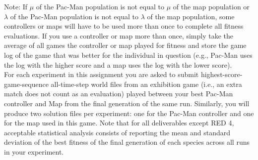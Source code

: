 \documentclass{article}
\begin{document}
Note: If $\mu$ of the Pac-Man population is not equal to $\mu$  of the map population or $\lambda$ of the Pac-Man population is not equal to $\lambda$ of the map population, some controllers or maps will have to be used more than once to complete all fitness evaluations. If you use a controller or map more than once, simply take the average of all games the controller or map played for fitness and store the game log of the game that was better for the individual in question (e.g., Pac-Man uses the log with the higher score and a map uses the log with the lower score).\\


For each experiment in this assignment you are asked to submit highest-score-game-sequence all-time-step world files from an exhibition game (i.e., an extra match does not count as an evaluation) played between your best Pac-Man controller and Map from the final generation of the same run. Similarly, you will produce two solution files per experiment: one for the Pac-Man controller and one for the map used in this game. Note that for all deliverables except RED 4, acceptable statistical analysis consists of reporting the mean and standard deviation of the best fitness of the final generation of each species across all runs in your experiment.
\end{document}
